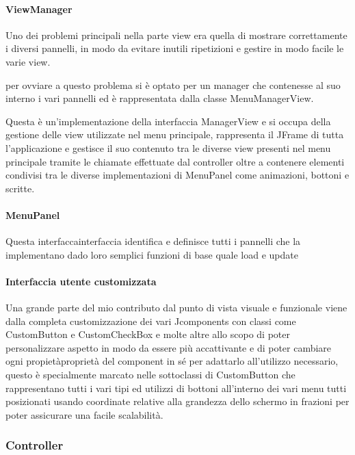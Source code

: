 \documentclass[a4paper,12pt]{report}
\begin{document}
\paragraph{ViewManager} Uno dei problemi principali nella parte view era quella di mostrare correttamente i diversi pannelli, in modo da evitare inutili ripetizioni e gestire in modo facile le varie view. 

per ovviare a questo problema si è optato per un manager che contenesse al suo interno i vari pannelli ed è rappresentata dalla classe MenuManagerView. 

Questa è un’implementazione della interfaccia ManagerView e si occupa della gestione delle view utilizzate nel menu principale, rappresenta il JFrame di tutta l’applicazione e gestisce il suo contenuto tra le diverse view presenti nel menu principale tramite le chiamate effettuate dal controller oltre a contenere elementi condivisi tra le diverse implementazioni di MenuPanel come animazioni, bottoni e scritte. 

\paragraph{MenuPanel} Questa interfaccainterfaccia identifica e definisce tutti i pannelli che la implementano dado loro semplici funzioni di base quale load e update 

\paragraph{Interfaccia utente customizzata} Una grande parte del mio contributo dal punto di vista visuale e funzionale viene dalla completa customizzazione dei vari Jcomponents con classi come CustomButton e CustomCheckBox e molte altre allo scopo di poter personalizzare aspetto in modo da essere più accattivante e di poter cambiare ogni propietàproprietà del component in sé per adattarlo all’utilizzo necessario, questo è specialmente marcato nelle sottoclassi di CustomButton che rappresentano tutti i vari tipi ed utilizzi di bottoni all’interno dei vari menu tutti posizionati usando coordinate relative alla grandezza dello schermo in frazioni per poter assicurare una facile scalabilità. 

\subsubsection{Controller}
\end{document}
